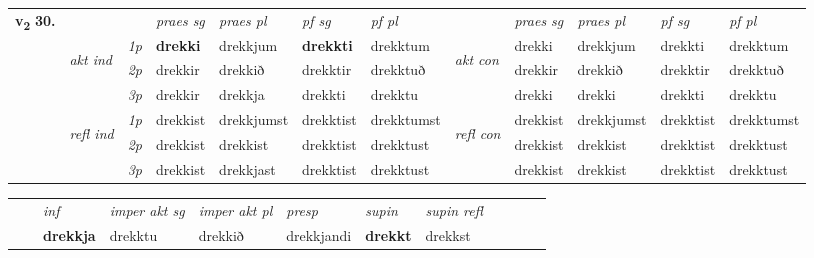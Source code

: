 \begin{tabular}{llllllllllll} \toprule
\multirow{4}{*}{{{\textbf{v{\textsubscript{2}}} \Large{\textbf{30.}}}}}  & &   &  \textit{praes sg}  & \textit{praes pl}  &\textit{ pf sg} & \textit{pf pl} &  &  \textit{praes sg}  & \textit{praes pl}  & \textit{pf sg} & \textit{pf pl } \\*
	\cmidrule{4-7} \cmidrule{9-12}
 & \multirow{3}{*}{\begin{turn}{90}\textit{akt ind}\end{turn}} & {\textit{1p}} & \textbf{drekki} & drekkjum    & \textbf{drekkti} & drekktum & \multirow{3}{*}{\begin{turn}{90}\textit{akt con}\end{turn}} &drekki & drekkjum & drekkti & drekktum\\*
& &  {\textit{2p}} &  drekkir  & drekkið   & drekktir & drekktuð & & drekkir & drekkið & drekktir & drekktuð \\*
& &  {\textit{3p}} & drekkir & drekkja   & drekkti & drekktu & & drekki & drekki& drekkti & drekktu  \\*
\cmidrule{4-7} \cmidrule{9-12}
 &\multirow{3}{*}{\begin{turn}{90}\textit{refl ind}\end{turn}} & {\textit{1p}} & drekkist & drekkjumst    & drekktist & drekktumst & \multirow{3}{*}{\begin{turn}{90}\textit{refl con}\end{turn}}  &drekkist & drekkjumst & drekktist & drekktumst\\*
 &&  {\textit{2p}} &  drekkist  & drekkist   & drekktist & drekktust & &drekkist & drekkist & drekktist & drekktust \\*
& &  {\textit{3p}} & drekkist & drekkjast   & drekktist & drekktust & & drekkist & drekkist& drekktist & drekktust  \\*
\cmidrule{4-7} \cmidrule{9-12}
\end{tabular}


\begin{tabular}{llllllllllll}
 & & \textit{inf} & \textit{imper akt sg} & \textit{imper akt pl}   & \textit{presp} & \textit{supin} & \textit{supin refl}      \\*
  & & \textbf{drekkja} & drekktu  & drekkið   & drekkjandi &  \textbf{drekkt} & drekkst  \\*
\cmidrule{1-12}
\end{tabular}



